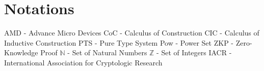 \chapter*{Notations}

AMD - Advance Micro Devices
CoC  - Calculus of Construction
CIC - Calculus of Inductive Construction
PTS - Pure Type System
Pow - Power Set
ZKP - Zero-Knowledge Proof
$\mathbb{N}$ - Set of Natural Numbers
$\mathbb{Z}$ - Set of Integers
IACR  - International Association for Cryptologic Research